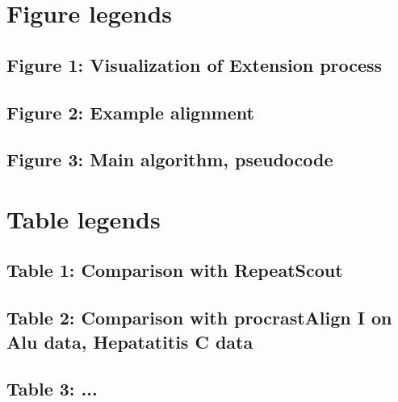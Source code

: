 \documentclass{llncs}
\begin{document}
\section{Figure legends}
\subsection{Figure 1: Visualization of Extension process}
\subsection{Figure 2: Example alignment}
\subsection{Figure 3: Main algorithm, pseudocode}

\section{Table legends}
\subsection{Table 1: Comparison with RepeatScout}
\subsection{Table 2: Comparison with procrastAlign I on Alu data, Hepatatitis C data}
\subsection{Table 3: ...}


\small

\end{document}
